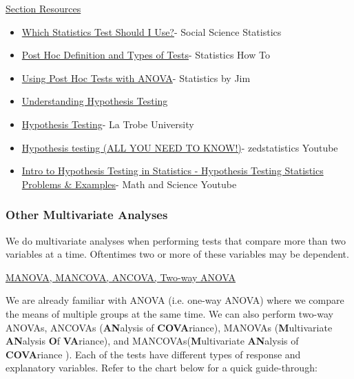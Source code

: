 \documentclass{article}
\begin{document}
\underline{Section Resources}

\begin{itemize}
    \item \href{https://www.socscistatistics.com/tests/what_stats_test_wizard.aspx}{Which Statistics Test Should I Use?}- Social Science Statistics
    \item \href{https://www.statisticshowto.com/probability-and-statistics/statistics-definitions/post-hoc/}{Post Hoc Definition and Types of Tests}- Statistics How To
    \item \href{https://statisticsbyjim.com/anova/post-hoc-tests-anova/}{Using Post Hoc Tests with ANOVA}- Statistics by Jim
    \item \href{https://www.geeksforgeeks.org/understanding-hypothesis-testing/}{Understanding Hypothesis Testing}
    \item \href{https://latrobe.libguides.com/maths/hypothesis-testing}{Hypothesis Testing}- La Trobe University
    \item \href{https://www.youtube.com/watch?v=8JIe_cz6qGA}{Hypothesis testing (ALL YOU NEED TO KNOW!)}- zedstatistics Youtube
    \item \href{https://www.youtube.com/watch?v=VK-rnA3-41c}{Intro to Hypothesis Testing in Statistics - Hypothesis Testing Statistics Problems \& Examples}- Math and Science Youtube
\end{itemize}

\newpage
\subsubsection{Other Multivariate Analyses}

We do multivariate analyses when performing tests that compare more than two variables at a time. Oftentimes two or more of these variables may be dependent.

\underline{MANOVA, MANCOVA, ANCOVA, Two-way ANOVA}

We are already familiar with ANOVA (i.e. one-way ANOVA) where we compare the means of multiple groups at the same time. We can also perform two-way ANOVAs, ANCOVAs (\textbf{AN}alysis of \textbf{COVA}riance), MANOVAs (\textbf{M}ultivariate \textbf{AN}alysis \textbf{O}f \textbf{VA}riance), and MANCOVAs(\textbf{M}ultivariate \textbf{AN}alysis of \textbf{COVA}riance ). Each of the tests have different types of response and explanatory variables. Refer to the chart below for a quick guide-through:
\end{document}
